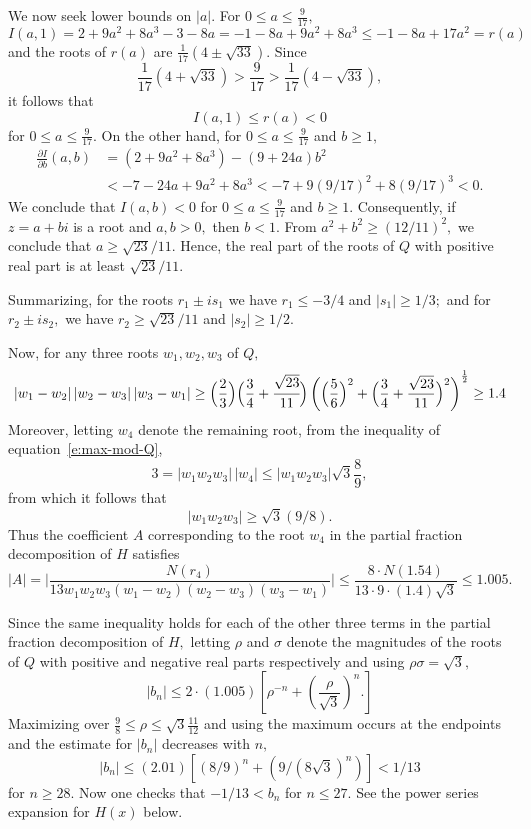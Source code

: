 \documentclass[a4paper,reqno,index]{amsart}
\numberwithin{equation}{section}
\theoremstyle{definition}
\begin{document}
We now seek lower bounds on $|a|.$  For $0 \le a\le \frac{9}{17},$ 
\[
 I(a,1) = 2+9a^2+8a^3 -3-8a=-1 -8a + 9a^2+8a^3 \le -1-8a+17a^2 = r(a)
\]
 and the roots of $r(a)$ are $\frac{1}{17} ( 4\pm \sqrt{33}).$
 Since
 \[
 \frac{1}{17}(4+\sqrt{33}) > \frac{9}{17} > \frac{1}{17}(4-\sqrt{33}),
 \]
  it follows  that
\[
 I(a,1)\le  r(a)<0 
\]
  for $0\le a\le \frac{9}{17}.$ 
On the other hand, for $0\le a\le \frac{9}{17}$ and $b\ge 1,$
\[
\begin{split}
 \frac{\partial I}{\partial b}(a,b)  & =(2+9a^2+8a^3) - (9+24a)b^2
 \\ &  < -7 -24a + 9a^2 + 8 a^3 < -7 + 9 (9/17)^2 + 8(9/17)^3  < 0. 
\end{split}
\]
 We conclude that $I(a,b)< 0$ for $0\le a\le \frac{9}{17}$ and $b\ge 1.$ 
 Consequently, if $z=a+bi$ is a root and $a,b>0,$ then  $b<1.$ From
 $a^2+b^2 \ge (12/11)^2,$ we conclude that $a\ge \sqrt{23}/{11}.$
 Hence, the real part of the roots of $Q$ with positive real part is at least $\sqrt{23}/{11}$.

  Summarizing, for the  roots $r_1\pm i s_1$  we have $r_1 \le -3/4$
  and $|s_1| \ge 1/3;$ 
  and for $r_2\pm i s_2,$ we have 
  $r_2\ge  \sqrt{23}/{11}$ and $|s_2|\ge 1/2.$ 

 Now, for any three roots $w_1,w_2,w_3$ of $Q,$  
\[
|w_1-w_2|\, |w_2-w_3|\, |w_3-w_1| \ge  
  \Big(\frac{2}{3}\Big)\Big(\frac34+\cfrac{\sqrt{23}}{11}\Big) 
   \left (\Big(\frac{5}{6}\Big)^2 + \Big(\frac34+\frac{\sqrt{23}}{11}\Big)^2\right)^\frac12
   \ge 1.4
\]
  Moreover, letting $w_4$ denote the remaining root, 
  from the inequality of equation~\eqref{e:max-mod-Q},
\[
 3= |w_1w_2w_3|\, |w_4|  \le |w_1 w_2 w_3| \sqrt{3}\frac{8}{9},
\]
from which it follows that 
\[
|w_1w_2w_3|\ge \sqrt{3}(9/8).
\]
Thus the  coefficient $A$ corresponding to the root $w_4$
 in the partial fraction decomposition of $H$ satisfies
\[
 |A| = \bigg|\frac{N(r_4)}{13 w_1 w_2 w_3 (w_1-w_2)(w_2-w_3)(w_3-w_1)}\bigg| 
 \le \frac{8\cdot N(1.54)}{13\cdot 9 \cdot(1.4) \sqrt{3}}
 \le 1.005.
\]

 
 
  Since the same inequality holds for each of the other
 three terms in the partial fraction decomposition of $H,$
 letting $\rho$ and $\sigma$ denote the magnitudes
 of the roots of $Q$ with positive and negative real
 parts respectively and using $\rho \sigma=\sqrt{3},$ 
 \[
 |b_n| \le 2 \cdot (1.005)[ \rho^{-n} + (\frac{\rho}{\sqrt{3}})^n. ]
 \]
  Maximizing over $\frac{9}{8} \le \rho \le \sqrt{3}\frac{11}{12}$
  and using the maximum occurs at the endpoints and 
  the estimate for $|b_n|$ decreases with $n,$
\[
 |b_n| \le  (2.01) [ (8/9)^n + (9/(8 \sqrt{3})^n) ]
 <1/13
\]
  for $n\ge 28.$  Now one checks that $-1/13 < b_n$
  for 
  $n\le 27.$  See the power series expansion for $H(x)$ below.
\end{document}
